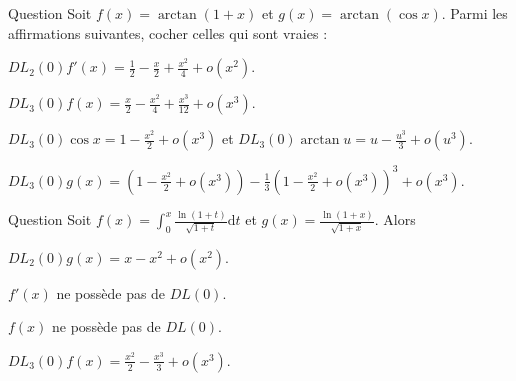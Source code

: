 \begin{multi}[multiple,feedback=
{On a : \(\displaystyle f'(x)=\frac{1}{1+(1+x)^2}=\frac{1}{2}\times\frac{1}{1+x+\frac{x^2}{2}}=\frac{1}{2}-\frac{x}{2}+\frac{x^2}{4}+o(x^2)\). Ce qui par intégration, puisque \(f(0)=\pi/4\), donne
\[DL_3(0)f(x)=\frac{\pi}{4}+\frac{x}{2}-\frac{x^2}{4}+\frac{x^3}{12}+o(x^3).\]
Ensuite, avec \(\displaystyle u=\cos x-1=-\frac{x^2}{2}+o(x^3)\), on aura : 
\[g(x)=\arctan (1+u)=\frac{\pi}{4}+\frac{u}{2}-\frac{u^2}{4}+o(u^2)=\frac{\pi}{4}-\frac{x^2}{4}+o(x^3).\] 
}]{Question}
Soit \(\displaystyle f(x)=\arctan (1+x)\) et \(\displaystyle g(x)=\arctan (\cos x)\). Parmi les affirmations suivantes, cocher celles qui sont vraies :

    \item* \(\displaystyle DL_2(0)f'(x)=\frac{1}{2}-\frac{x}{2}+\frac{x^2}{4}+o(x^2)\).
    \item \(\displaystyle DL_3(0)f(x)=\frac{x}{2}-\frac{x^2}{4}+\frac{x^3}{12}+o(x^3)\).
    \item* \(\displaystyle DL_3(0)\cos x=1-\frac{x^2}{2}+o(x^3)\) et \(\displaystyle DL_3(0)\arctan u=u-\frac{u^3}{3}+o(u^3)\).
    \item \(\displaystyle DL_3(0)g(x)=\left(1-\frac{x^2}{2}+o(x^3)\right)-\frac{1}{3}\left(1-\frac{x^2}{2}+o(x^3)\right)^3+o(x^3)\).
\end{multi}


\begin{multi}[multiple,feedback=
{On a : \(\displaystyle f'(x)=g(x)\) et \(DL_2(0)g(x)=x-x^2+o(x^2)\). Par intégration, et puisque \(f(0)=0\), on obtient :
\[DL_3(0)f(x)=\frac{x^2}{2}-\frac{x^3}{3}+o(x^3).\]
}]{Question}
Soit \(\displaystyle f(x)=\int _0^x\frac{\ln (1+t)}{\sqrt{1+t}}\mathrm{d}t\) et \(\displaystyle g(x)=\frac{\ln (1+x)}{\sqrt{1+x}}\). Alors

    \item* \(\displaystyle DL_2(0)g(x)=x-x^2+o(x^2)\).
    \item \(f'(x)\) ne possède pas de \(DL(0)\).
    \item \(f(x)\) ne possède pas de \(DL(0)\).
    \item* \(\displaystyle DL_3(0)f(x)=\frac{x^2}{2}-\frac{x^3}{3}+o(x^3)\).
\end{multi}


